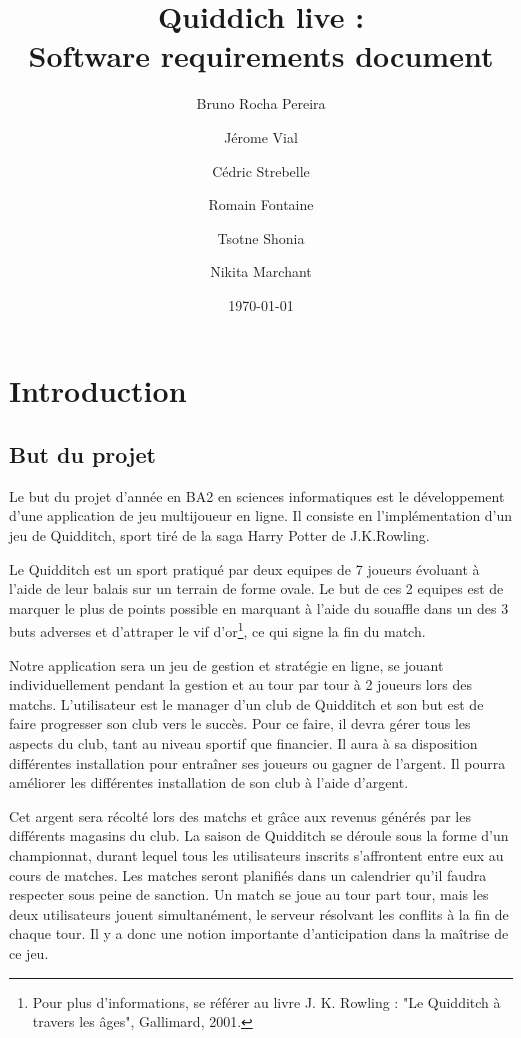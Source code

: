 \documentclass[a4paper]{report}
\title{Quiddich live : \\Software requirements document}
\author{Bruno Rocha Pereira \and Jérome Vial \and Cédric Strebelle \and
Romain Fontaine \and Tsotne Shonia \and Nikita Marchant}
\date{\today}
\begin{document}
\maketitle
\tableofcontents
\clearpage


\chapter{Introduction}
\section{But du projet}
Le but du projet d'année en BA2 en sciences informatiques est le développement d'une application de jeu multijoueur en ligne.
Il consiste en l'implémentation d'un jeu de Quidditch, sport tiré de la saga Harry Potter de J.K.Rowling.


Le Quidditch est un sport pratiqué par deux \glspl{equipe} de 7 \glspl{joueur} évoluant à l'aide de leur balais sur un terrain de forme ovale. Le but de ces 2 \glspl{equipe} est de marquer le plus de points possible en marquant à l'aide du souaffle dans un des 3 buts adverses et d'attraper le vif d'or\footnote{Pour plus d'informations, se référer au livre J. K. Rowling : "Le Quidditch à travers les âges", Gallimard, 2001.}, ce qui signe la fin du match. 


Notre application sera un jeu de gestion et stratégie en ligne, se jouant individuellement pendant la gestion et au tour par tour à 2 joueurs lors des matchs. L'\gls{utilisateur} est le \gls{manager} d'un \gls{club} de Quidditch et son but est de faire progresser son \gls{club} vers le succès. Pour ce faire, il devra gérer tous les aspects du \gls{club}, tant au niveau sportif que financier. Il aura à sa disposition différentes installation pour entraîner ses \glspl{joueur} ou gagner de l'argent. Il pourra améliorer les différentes installation de son \gls{club} à l'aide d'argent.

Cet argent sera récolté lors des matchs et grâce aux revenus générés par les différents magasins du \gls{club}. La saison de Quidditch se déroule sous la forme d'un championnat, durant lequel tous les \glspl{utilisateur} inscrits s'affrontent entre eux au cours de matches. Les matches seront planifiés dans un calendrier qu'il faudra respecter sous peine de sanction. Un match se joue au tour part tour, mais les deux \glspl{utilisateur} jouent simultanément, le \gls{serveur} résolvant les conflits à la fin de chaque tour. Il y a donc une notion importante d'anticipation dans la maîtrise de ce jeu.
\end{document}
